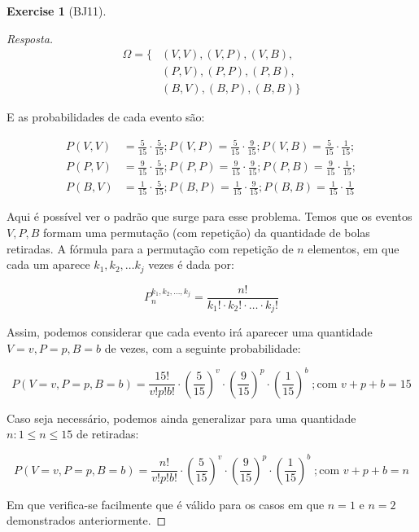 \documentclass[
]{article}
\theoremstyle{definition}
\theoremstyle{definition}
\theoremstyle{definition}
\newtheorem{exercise}{Exercise}[section]
\theoremstyle{definition}
\theoremstyle{remark}
\begin{document}
\begin{exercise}[BJ11]
\begin{proof}[Resposta]
\begin{align*}
\Omega = \{&(V,V), (V,P), (V,B), \\
&(P,V), (P,P), (P,B), \\
&(B,V), (B,P), (B,B)\}
\end{align*}

E as probabilidades de cada evento são:

\begin{align*}
P(V,V) &= \frac{5}{15} \cdot \frac{5}{15}; P(V,P) = \frac{5}{15} \cdot \frac{9}{15}; P(V,B) = \frac{5}{15} \cdot \frac{1}{15};\\
P(P,V) &= \frac{9}{15} \cdot \frac{5}{15}; P(P,P) = \frac{9}{15} \cdot \frac{9}{15}; P(P,B) = \frac{9}{15} \cdot \frac{1}{15};\\
P(B,V) &= \frac{1}{15} \cdot \frac{5}{15}; P(B,P) = \frac{1}{15} \cdot \frac{9}{15}; P(B,B) = \frac{1}{15} \cdot \frac{1}{15}
\end{align*}

Aqui é possível ver o padrão que surge para esse problema. Temos que os eventos \(V,P,B\) formam uma permutação (com repetição) da quantidade de bolas retiradas. A fórmula para a permutação com repetição de \(n\) elementos, em que cada um aparece \(k_{1},k_{2}, \dots k_{j}\) vezes é dada por:

\begin{equation*}
P_{n}^{k_{1},k_{2},\dots,k_{j}} = \frac{n!}{k_{1}! \cdot k_{2}! \cdot \dots \cdot k_{j}!}
\end{equation*}

Assim, podemos considerar que cada evento irá aparecer uma quantidade \(V = v, P = p, B = b\) de vezes, com a seguinte probabilidade:

\begin{equation*}
P(V=v, P=p, B=b) = \frac{15!}{v!p!b!} \cdot \left(\frac{5}{15}\right)^{v} \cdot \left(\frac{9}{15}\right)^{p} \cdot \left(\frac{1}{15}\right)^{b} \; ; \text{com }v+p+b = 15
\end{equation*}

Caso seja necessário, podemos ainda generalizar para uma quantidade \(n : 1 \le n \le 15\) de retiradas:

\begin{equation*}
P(V=v, P=p, B=b) = \frac{n!}{v!p!b!} \cdot \left(\frac{5}{15}\right)^{v} \cdot \left(\frac{9}{15}\right)^{p} \cdot \left(\frac{1}{15}\right)^{b} \; ; \text{com }v+p+b = n
\end{equation*}

Em que verifica-se facilmente que é válido para os casos em que \(n=1\) e \(n=2\) demonstrados anteriormente.
\end{proof}


\end{exercise}
\end{document}
